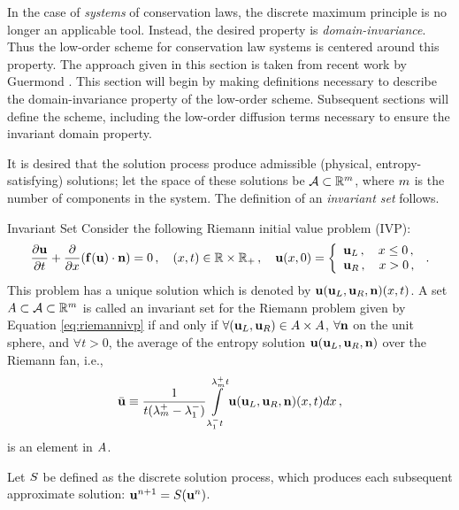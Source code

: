 In the case of \emph{systems} of conservation laws, the discrete maximum
principle is no longer an applicable tool. Instead, the desired property
is \emph{domain-invariance}.
Thus the low-order scheme for conservation law systems is centered around
this property.
 The approach given in this section is taken
from recent work by Guermond \cite{guermond_invariantdomain}. This section
will begin by making definitions necessary to describe the domain-invariance
property of the low-order scheme. Subsequent sections will define the scheme,
including the low-order diffusion terms necessary to ensure the
invariant domain property.

It is desired that the solution process produce admissible
(physical, entropy-satisfying) solutions; let the space of these solutions be
$\admissibleset\subset\realspace[\ncomponents]$, where $m$ is the
number of components in the system. The definition of an \emph{invariant set}
follows.
\begin{definition}{Invariant Set}
Consider the following Riemann initial value problem (IVP):
\begin{equation}\label{eq:riemannivp}
  \ppt{\vectorsolution} + \pd{}{x}(\consflux(\vectorsolution)\cdot\normalvector)
    = 0 \eqc
  \quad (x,t)\in\realspace\times\realspace_+ \eqc
  \quad \vectorsolution(x,0) = \left\{\begin{array}{l}
    \vectorsolution_L \eqc \quad x \leq 0 \eqc\\
    \vectorsolution_R \eqc \quad x > 0 \eqc
  \end{array}\right. \eqp
\end{equation}
This problem has a unique solution which is denoted by
$\mathbf{u}(\mathbf{u}_L,\mathbf{u}_R,\mathbf{n})(x,t)$.
A set $\invariantset\subset\admissibleset\subset\realspace[\ncomponents]$ 
is called an invariant set for the Riemann problem given by Equation
\eqref{eq:riemannivp} if and only if
$\forall(\mathbf{u}_L,\mathbf{u}_R)\in A\times A$,
$\forall\mathbf{n}$ on the unit sphere, and $\forall t > 0$, the average
of the entropy solution 
$\mathbf{u}(\mathbf{u}_L,\mathbf{u}_R,\mathbf{n})$
over the Riemann fan, i.e.,
\begin{equation}
  \bar{\mathbf{u}} \equiv
    \frac{1}{t(\lambda_{m}^+ - \lambda_1^-)}
    \int\limits_{\lambda_1^- t}^{\lambda_{m}^+ t}
    \mathbf{u}(\mathbf{u}_L,\mathbf{u}_R,\mathbf{n})(x,t)dx \,,
\end{equation}
is an element in $A$.
\end{definition}
Let $S$ be defined as the discrete solution process,
which produces each subsequent approximate solution:
$\mathbf{u}^{n+1} = S(\mathbf{u}^n)$.

